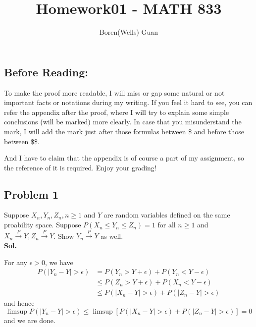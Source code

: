 \documentclass[lang=en,11pt,a4paper,citestyle =authoryear]{elegantpaper}
\title{Homework01 - MATH 833}
\author{Boren(Wells) Guan}
\begin{document}
\maketitle

\subsection*{Before Reading:}\par
To make the proof more readable, I will miss or gap some natural or not important facts or notations during my writing. If you feel it hard to see, you can refer the appendix after the proof, where I will try to explain some simple conclusions (will be marked) more clearly. In case that you misunderstand the mark, I will add the mark just after those formulas between \$ and before those between \$\$.\par
And I have to claim that the appendix is of course a part of my assignment, so the reference of it is required. Enjoy your grading!

\subsection*{Problem 1} 
Suppose $X_n,Y_n,Z_n, n\geq 1$ and $Y$ are random variables defined on the same proability space. Suppose $P(X_n\leq Y_n\leq Z_n) = 1$ for all $n\geq 1$ and $X_n\overset{P}{\to} Y,Z_n\overset{P}{\to} Y$. Show $Y_n\overset{P}{\to} Y$ as well.
\vspace{0.5em}\\
\textbf{Sol.} \par
For any $\epsilon > 0$, we have
\[
\begin{aligned}
    P(|Y_n - Y| > \epsilon) &= P(Y_n > Y+\epsilon) + P(Y_n < Y-\epsilon) \\&\leq P(Z_n > Y+\epsilon) + P(X_n < Y-\epsilon)\\  &\leq P(|X_n-Y| > \epsilon) + P(|Z_n-Y| > \epsilon)
\end{aligned}
\]
and hence
\[
\limsup P(|Y_n - Y| > \epsilon)  \leq \limsup \left[P(|X_n-Y| > \epsilon) + P(|Z_n-Y| > \epsilon)\right] = 0
\]
and we are done.
\par 
\vspace{0.5em}
\end{document}
